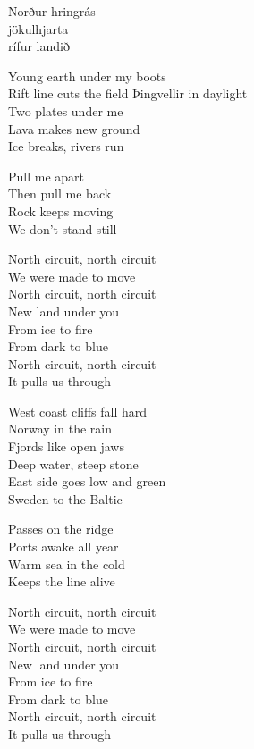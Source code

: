\begin{lyrics}
Norður hringrás\\
jökulhjarta\\
rífur landið

Young earth under my boots\\
Rift line cuts the field
Þingvellir in daylight\\
Two plates under me\\
Lava makes new ground\\
Ice breaks, rivers run

Pull me apart\\
Then pull me back\\
Rock keeps moving\\
We don’t stand still

North circuit, north circuit\\
We were made to move\\
North circuit, north circuit\\
New land under you\\
From ice to fire\\
From dark to blue\\
North circuit, north circuit\\
It pulls us through

West coast cliffs fall hard\\
Norway in the rain\\
Fjords like open jaws\\
Deep water, steep stone\\
East side goes low and green\\
Sweden to the Baltic

Passes on the ridge\\
Ports awake all year\\
Warm sea in the cold\\
Keeps the line alive

North circuit, north circuit\\
We were made to move\\
North circuit, north circuit\\
New land under you\\
From ice to fire\\
From dark to blue\\
North circuit, north circuit\\
It pulls us through


\end{lyrics}
